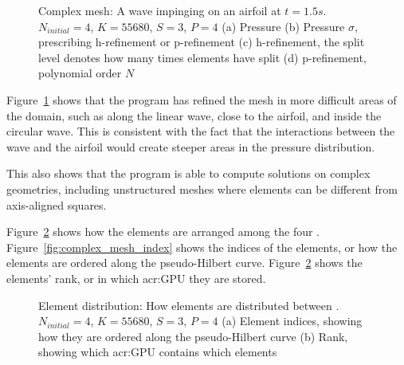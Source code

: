 \begin{figure}[H]
    \caption{Complex mesh: A wave impinging on an airfoil at \(t = 1.5 s\). \(N_{initial} = 4\), \(K = 55680\), \(S = 3\), \(P = 4\) (a) Pressure (b) Pressure \(\sigma \), prescribing h-refinement or p-refinement (c) h-refinement, the split level denotes how many times elements have split (d) p-refinement, polynomial order \(N\)}\label{fig:complex_mesh_solution}
\end{figure}

Figure~\ref{fig:complex_mesh_solution} shows that the program has refined the mesh in more difficult
areas of the domain, such as along the linear wave, close to the airfoil, and inside the circular
wave. This is consistent with the fact that the interactions between the wave and the airfoil would
create steeper areas in the pressure distribution.

This also shows that the program is able to compute solutions on complex geometries, including
unstructured meshes where elements can be different from axis-aligned squares.

Figure~\ref{fig:complex_mesh_elements} shows how the elements are arranged among the four
. Figure~\ref{fig:complex_mesh_index} shows the indices of the elements, or how
the elements are ordered along the pseudo-Hilbert curve. Figure~\ref{fig:complex_mesh_elements}
shows the elements' rank, or in which \acrshort{acr:GPU} they are stored.

\begin{figure}[H]
    \centering
    \hfill
    \caption{Element distribution: How elements are distributed between . \(N_{initial} = 4\), \(K = 55680\), \(S = 3\), \(P = 4\) (a) Element indices, showing how they are ordered along the pseudo-Hilbert curve (b) Rank, showing which \acrshort{acr:GPU} contains which elements}\label{fig:complex_mesh_elements}
\end{figure}

